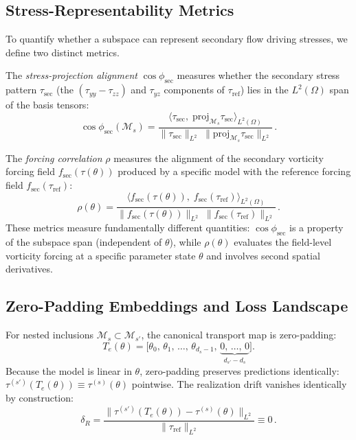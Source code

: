 \documentclass[preprint,aps,prb,longbibliography,superscriptaddress]{revtex4-2}
\newcommand{\dR}{\delta_R}
\newcommand{\fsec}{f_{\text{sec}}}
\newcommand{\tref}{\tau_{\text{ref}}}
\begin{document}
\subsection{Stress-Representability Metrics}
\label{sec:representability}

To quantify whether a subspace can represent secondary flow driving stresses,
we define two distinct metrics.

The \emph{stress-projection alignment} $\cos\phi_{\mathrm{sec}}$ measures
whether the secondary stress pattern $\tau_{\mathrm{sec}}$ (the
$(\tau_{yy}-\tau_{zz})$ and $\tau_{yz}$ components of $\tref$) lies in the
$L^2(\Omega)$ span of the basis tensors:
\begin{equation}\label{eq:controllability}
  \cos\phi_{\mathrm{sec}}(\mathcal{M}_s) =
  \frac{\langle \tau_{\mathrm{sec}},\;
        \mathrm{proj}_{\mathcal{M}_s}\tau_{\mathrm{sec}}
        \rangle_{L^2(\Omega)}}
       {\|\tau_{\mathrm{sec}}\|_{L^2}\;
        \|\mathrm{proj}_{\mathcal{M}_s}\tau_{\mathrm{sec}}\|_{L^2}}\,.
\end{equation}

The \emph{forcing correlation} $\rho$ measures the alignment of the secondary
vorticity forcing field $\fsec(\tau(\theta))$ produced by a specific model with
the reference forcing field $\fsec(\tref)$:
\begin{equation}\label{eq:rho}
  \rho(\theta) =
  \frac{\langle \fsec(\tau(\theta)),\;
        \fsec(\tref) \rangle_{L^2(\Omega)}}
       {\|\fsec(\tau(\theta))\|_{L^2}\;
        \|\fsec(\tref)\|_{L^2}}\,.
\end{equation}
These metrics measure fundamentally different quantities: $\cos\phi_{\mathrm{sec}}$
is a property of the subspace span (independent of $\theta$), while $\rho(\theta)$
evaluates the field-level vorticity forcing at a specific parameter state $\theta$
and involves second spatial derivatives.

\subsection{Zero-Padding Embeddings and Loss Landscape}
\label{sec:embedding}

For nested inclusions $\mathcal{M}_s \subset \mathcal{M}_{s'}$, the canonical
transport map is zero-padding:
\begin{equation}\label{eq:transport}
  T_e(\theta) = \bigl[\theta_0,\, \theta_1,\, \dotsc,\,
    \theta_{d_s-1},\,
    \underbrace{0,\, \dotsc,\, 0}_{d_{s'}-d_s}\bigr].
\end{equation}
Because the model is linear in $\theta$, zero-padding preserves predictions
identically: $\tau^{(s')}(T_e(\theta)) \equiv \tau^{(s)}(\theta)$ pointwise.
The realization drift vanishes identically by construction:
\begin{equation}\label{eq:drift}
  \dR = \frac{\|\tau^{(s')}(T_e(\theta)) - \tau^{(s)}(\theta)\|_{L^2}}
             {\|\tref\|_{L^2}} \equiv 0\,.
\end{equation}
\end{document}
